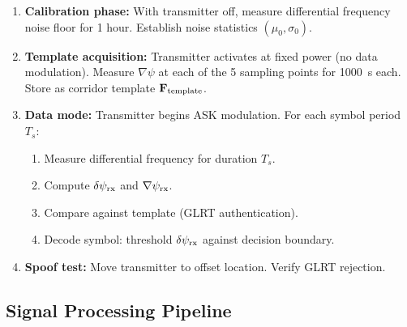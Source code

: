 \documentclass[11pt,onecolumn]{article}
\begin{document}
\begin{enumerate}
\item \textbf{Calibration phase:} With transmitter off, measure
differential frequency noise floor for 1 hour.
Establish noise statistics $(\mu_0, \sigma_0)$.

\item \textbf{Template acquisition:} Transmitter activates at fixed
power (no data modulation). Measure $\nabla\psi$ at each of the 5
sampling points for 1000~s each. Store as corridor template
$\mathbf{F}_{\rm template}$.

\item \textbf{Data mode:} Transmitter begins ASK modulation.
For each symbol period $T_s$:
\begin{enumerate}
\item Measure differential frequency for duration $T_s$.
\item Compute $\delta\psi_{\rm rx}$ and $\nabla\psi_{\rm rx}$.
\item Compare against template (GLRT authentication).
\item Decode symbol: threshold $\delta\psi_{\rm rx}$ against
decision boundary.
\end{enumerate}

\item \textbf{Spoof test:} Move transmitter to offset location.
Verify GLRT rejection.
\end{enumerate}

\subsection{Signal Processing Pipeline}
\end{document}
